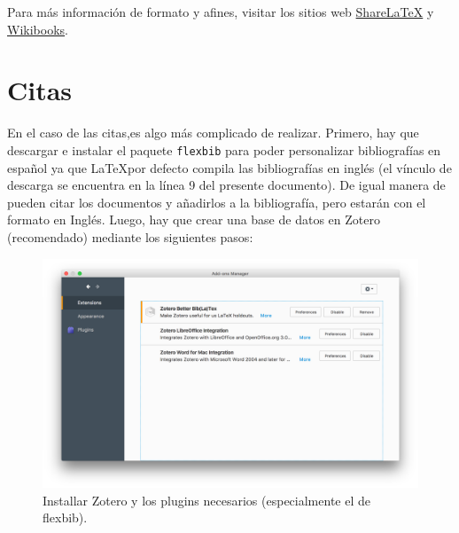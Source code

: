\documentclass[11pt,]{article}
\begin{document}
Para más información de formato y afines, visitar los sitios web \href{https://es.sharelatex.com/learn}{Share\LaTeX} y \href{https://en.wikibooks.org/wiki/LaTeX}{Wikibooks}.\\

\section{Citas\\}

En el caso de las citas,es algo más complicado de realizar. Primero, hay que descargar e instalar el paquete \texttt{flexbib} para poder personalizar bibliografías en español ya que \LaTeX por defecto compila las bibliografías en inglés (el vínculo de descarga se encuentra en la línea 9 del presente documento). De igual manera de pueden citar los documentos y añadirlos a la bibliografía, pero estarán con el formato en Inglés. Luego, hay que crear una base de datos en Zotero (recomendado) mediante los siguientes pasos:\\

\begin{figure}[!h]
\begin{center}
\includegraphics[width=\textwidth]{Figuras/plugins_zotero.png}
\caption{Installar Zotero y los plugins necesarios (especialmente el de flexbib).}
\label{etiqueta_figura1}
\end{center}
\end{figure}
\end{document}
